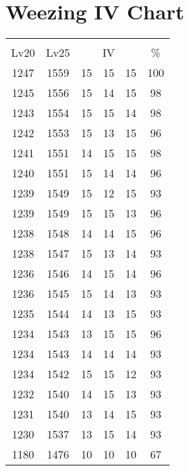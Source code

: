 \documentclass{article}%
\begin{document}
%
\normalsize%
\section{Weezing IV Chart}%
\label{sec:Weezing IV Chart}%
\renewcommand{\arraystretch}{1.5}%
\begin{tabular}{|c|c|c|c|c|c|}%
\hline%
\multicolumn{6}{|c|}{\textcolor{white}{ 
\linebreak{Weezing}
}%
\cellcolor{black}}\\%
\multicolumn{1}{|c}{Lv20}&\multicolumn{1}{c|}{Lv25}&\multicolumn{3}{c|}{IV}&\multicolumn{1}{|c|}{\%}\\%
\hline%
\rowcolor{color100}%
1247&1559&15&15&15&100\\%
\hline%
\rowcolor{color98}%
1245&1556&15&14&15&98\\%
\hline%
\rowcolor{color98}%
1243&1554&15&15&14&98\\%
\hline%
\rowcolor{color96}%
1242&1553&15&13&15&96\\%
\hline%
\rowcolor{color98}%
1241&1551&14&15&15&98\\%
\hline%
\rowcolor{color96}%
1240&1551&15&14&14&96\\%
\hline%
\rowcolor{color93}%
1239&1549&15&12&15&93\\%
\hline%
\rowcolor{color96}%
1239&1549&15&15&13&96\\%
\hline%
\rowcolor{color96}%
1238&1548&14&14&15&96\\%
\hline%
\rowcolor{color93}%
1238&1547&15&13&14&93\\%
\hline%
\rowcolor{color96}%
1236&1546&14&15&14&96\\%
\hline%
\rowcolor{color93}%
1236&1545&15&14&13&93\\%
\hline%
\rowcolor{color93}%
1235&1544&14&13&15&93\\%
\hline%
\rowcolor{color96}%
1234&1543&13&15&15&96\\%
\hline%
\rowcolor{color93}%
1234&1543&14&14&14&93\\%
\hline%
\rowcolor{color93}%
1234&1542&15&15&12&93\\%
\hline%
\rowcolor{color93}%
1232&1540&14&15&13&93\\%
\hline%
\rowcolor{color93}%
1231&1540&13&14&15&93\\%
\hline%
\rowcolor{color93}%
1230&1537&13&15&14&93\\%
\hline%
\rowcolor{color91}%
1180&1476&10&10&10&67\\%
\end{tabular}

%
\end{document}
